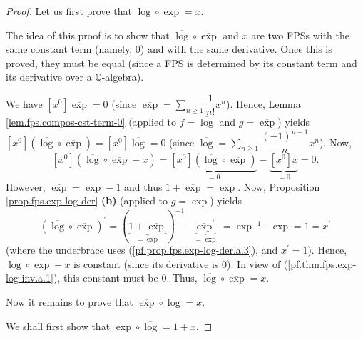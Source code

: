 \begin{proof}
Let us first prove that
$\overline{\log}\circ\overline{\exp}=x$.

The idea of this proof is to show that $\overline{\log}\circ
\overline{\exp}$ and $x$ are two FPSs with the same constant term (namely,
$0$) and with the same derivative. Once this is proved, they must be equal
(since a FPS is determined by its constant term and its derivative over a $\mathbb{Q}$-algebra).

We have $\left[x^{0}\right]\overline{\exp}=0$
(since $\overline{\exp}=\sum_{n\geq1}\dfrac{1}{n!}x^{n}$). Hence, Lemma
\ref{lem.fps.compos-cst-term-0} (applied to $f=\overline{\log}$ and
$g=\overline{\exp}$) yields $\left[x^{0}\right]\left(\overline{\log
}\circ\overline{\exp}\right)=\left[x^{0}\right]\overline{\log}=0$ (since
$\overline{\log}=\sum_{n\geq1}\dfrac{\left(-1\right)^{n-1}}{n}x^{n}$).
Now,
\begin{equation}
\left[x^{0}\right]\left(\overline{\log}\circ\overline{\exp}-x\right)
=\underbrace{\left[x^{0}\right]\left(\overline{\log}\circ\overline{\exp
}\right)}_{=0}-\underbrace{\left[x^{0}\right]x}_{=0}=0.
\label{pf.thm.fps.exp-log-inv.a.1}
\end{equation}
However, $\overline{\exp}=\exp-1$ and thus $1+\overline{\exp}=\exp$. Now,
Proposition \ref{prop.fps.exp-log-der} \textbf{(b)} (applied to $g=\overline
{\exp}$) yields
\[
\left(\overline{\log}\circ\overline{\exp}\right)^{\prime}=\left(
\underbrace{1+\overline{\exp}}_{=\exp}\right)^{-1}\cdot\underbrace{\overline
{\exp}^{\prime}}_{=\exp}=\exp^{-1}\cdot\exp=1=x^{\prime}
\]
(where the underbrace uses (\ref{pf.prop.fps.exp-log-der.a.3}), and $x^{\prime}=1$). Hence,
$\overline{\log}\circ\overline{\exp}-x$ is constant (since its derivative is $0$). In view of
(\ref{pf.thm.fps.exp-log-inv.a.1}), this constant must be $0$. Thus, $\overline{\log
}\circ\overline{\exp}=x$.

Now it remains to prove that $\overline{\exp}\circ\overline{\log}=x$.

We shall first show
that $\exp\circ\overline{\log}=1+x$.


\end{proof}
